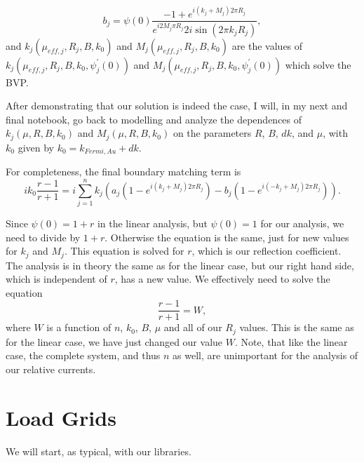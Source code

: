 \documentclass[11pt]{article}
\begin{document}
\begin{equation}
b_j = \psi(0) \frac{-1 + e^{i \left(k_j + M_j \right) 2 \pi R_j}}{e^{i 2 M_j \pi R_j} 2 i \sin \left( 2 \pi k_j R_j \right)},
\end{equation} and \(k_j \left(\mu_{eff,j}, R_j, B, k_0\right)\) and
\(M_j \left(\mu_{eff,j}, R_j, B, k_0 \right)\) are the values of
\(k_j\left(\mu_{eff,j}, R_j, B, k_0, \psi^\prime_j(0) \right)\) and
\(M_j\left(\mu_{eff,j}, R_j, B, k_0, \psi^\prime_j(0) \right)\) which
solve the BVP.

    After demonstrating that our solution is indeed the case, I will, in my
next and final notebook, go back to modelling and analyze the
dependences of \(k_j\left(\mu, R, B, k_0 \right)\) and
\(M_j\left(\mu, R, B, k_0 \right)\) on the parameters \(R\), \(B\),
\(dk\), and \(\mu\), with \(k_0\) given by \(k_0 = k_{Fermi, Au} + dk\).

    For completeness, the final boundary matching term is \begin{equation}
i k_0 \frac{r - 1}{r+1} = i \sum^{n}_{j = 1}k_j\left( a_j \left( 1 - e^{i \left(k_j + M_j\right) 2 \pi R_j} \right) - b_j \left( 1 - e^{i \left(-k_j + M_j\right) 2 \pi R_j}\right) \right).
\end{equation}

Since \(\psi(0) = 1 + r\) in the linear analysis, but \(\psi(0) = 1\)
for our analysis, we need to divide by \(1+r\). Otherwise the equation
is the same, just for new values for \(k_j\) and \(M_j\). This equation
is solved for \(r\), which is our reflection coefficient. The analysis
is in theory the same as for the linear case, but our right hand side,
which is independent of \(r\), has a new value. We effectively need to
solve the equation \begin{equation}
\frac{r - 1}{r+1} = W,
\end{equation} where \(W\) is a function of \(n\), \(k_0\), \(B\),
\(\mu\) and all of our \(R_j\) values. This is the same as for the
linear case, we have just changed our value \(W\). Note, that like the
linear case, the complete system, and thus \(n\) as well, are
unimportant for the analysis of our relative currents.

    \hypertarget{load-grids}{%
\section{Load Grids}\label{load-grids}}

    We will start, as typical, with our libraries.
\end{document}
